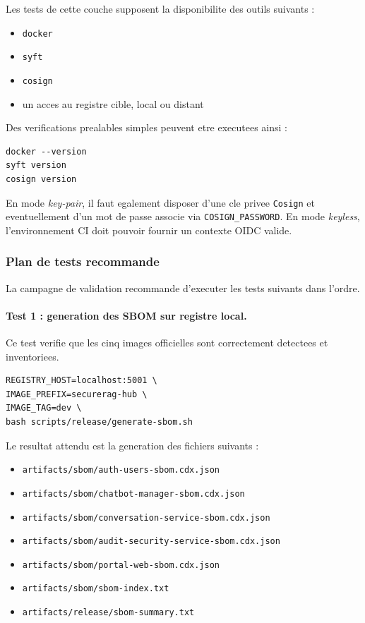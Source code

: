 Les tests de cette couche supposent la disponibilite des outils suivants :

\begin{itemize}
  \item \texttt{docker}
  \item \texttt{syft}
  \item \texttt{cosign}
  \item un acces au registre cible, local ou distant
\end{itemize}

Des verifications prealables simples peuvent etre executees ainsi :

\begin{verbatim}
docker --version
syft version
cosign version
\end{verbatim}

En mode \textit{key-pair}, il faut egalement disposer d'une cle privee \texttt{Cosign} et eventuellement d'un mot de passe associe via \texttt{COSIGN\_PASSWORD}. En mode \textit{keyless}, l'environnement CI doit pouvoir fournir un contexte OIDC valide.

\subsubsection{Plan de tests recommande}

La campagne de validation recommande d'executer les tests suivants dans l'ordre.

\paragraph{Test 1 : generation des SBOM sur registre local.}
Ce test verifie que les cinq images officielles sont correctement detectees et inventoriees.

\begin{verbatim}
REGISTRY_HOST=localhost:5001 \
IMAGE_PREFIX=securerag-hub \
IMAGE_TAG=dev \
bash scripts/release/generate-sbom.sh
\end{verbatim}

Le resultat attendu est la generation des fichiers suivants :

\begin{itemize}
  \item \texttt{artifacts/sbom/auth-users-sbom.cdx.json}
  \item \texttt{artifacts/sbom/chatbot-manager-sbom.cdx.json}
  \item \texttt{artifacts/sbom/conversation-service-sbom.cdx.json}
  \item \texttt{artifacts/sbom/audit-security-service-sbom.cdx.json}
  \item \texttt{artifacts/sbom/portal-web-sbom.cdx.json}
  \item \texttt{artifacts/sbom/sbom-index.txt}
  \item \texttt{artifacts/release/sbom-summary.txt}
\end{itemize}

